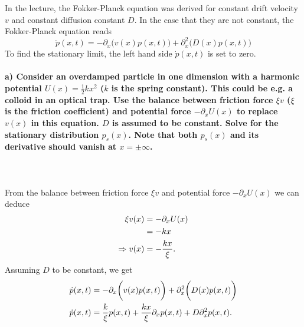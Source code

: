 In the lecture, the Fokker-Planck equation was derived for constant 
drift velocity $v$ and constant diffusion constant $D$. In the case 
that they are not constant, the Fokker-Planck equation reads
\begin{equation}
    \dot{p}(x,t)=-\partial_x\bigg(v(x)p(x,t)\bigg)+
    \partial_x^2\bigg(D(x)p(x,t)\bigg)
    \label{eq:fokker}
\end{equation}
To find the stationary limit, the left hand side $\dot p(x,t)$ is set 
to zero.

\paragraph{a) Consider an overdamped particle in one dimension with a 
    harmonic potential $U(x)=\frac{1}{2}kx^2$ ($k$ is the spring 
    constant). This could be e.g. a colloid in an optical trap. Use the 
    balance between friction force $\xi v$ ($\xi$ is the friction
    coefficient) and potential force $-\partial_xU(x)$ to replace 
    $v(x)$ in this equation. $D$ is assumed to be constant. Solve for 
    the stationary distribution $p_s(x)$. Note that both $p_s(x)$ and 
    its derivative should vanish at $x=\pm\infty$.
} \ \\
\\
    From the balance between friction force $\xi v$ and potential force 
    $-\partial_xU(x)$ we can deduce
    \begin{align}
        \xi v(x) 
        &= -\partial_xU(x) \notag \\
        &= -kx \notag \\
        \Rightarrow v(x) 
        &= -\frac{kx}{\xi}.
    \end{align}
    Assuming $D$ to be constant, we get
    \begin{align}
    	\dot{p}(x,t)&=-\partial_x\bigg(v(x)p(x,t)\bigg)+
        \partial_x^2\bigg(D(x)p(x,t)\bigg) \notag \\
        \dot{p}(x,t)&=\frac{k}{\xi} p(x,t) + \frac{kx}{\xi} \partial_x p(x,t) +
        D \partial_x^2 p(x,t) .
    \end{align}
